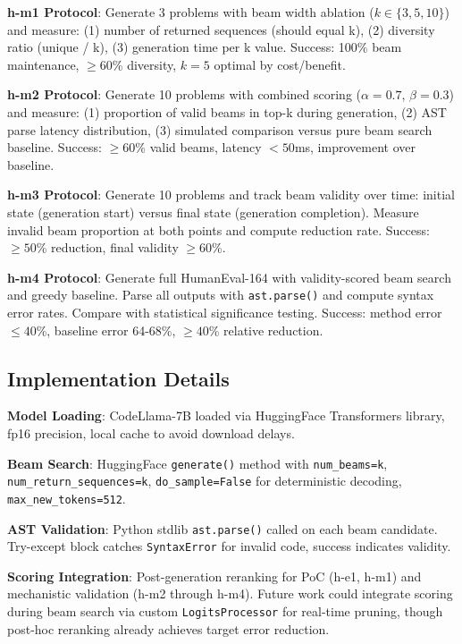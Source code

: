 \textbf{h-m1 Protocol}: Generate 3 problems with beam width ablation ($k \in \{3, 5, 10\}$) and measure: (1) number of returned sequences (should equal k), (2) diversity ratio (unique / k), (3) generation time per k value. Success: 100\% beam maintenance, $\geq 60$\% diversity, $k=5$ optimal by cost/benefit.

\textbf{h-m2 Protocol}: Generate 10 problems with combined scoring ($\alpha=0.7$, $\beta=0.3$) and measure: (1) proportion of valid beams in top-k during generation, (2) AST parse latency distribution, (3) simulated comparison versus pure beam search baseline. Success: $\geq 60$\% valid beams, latency $<50$ms, improvement over baseline.

\textbf{h-m3 Protocol}: Generate 10 problems and track beam validity over time: initial state (generation start) versus final state (generation completion). Measure invalid beam proportion at both points and compute reduction rate. Success: $\geq 50$\% reduction, final validity $\geq 60$\%.

\textbf{h-m4 Protocol}: Generate full HumanEval-164 with validity-scored beam search and greedy baseline. Parse all outputs with \texttt{ast.parse()} and compute syntax error rates. Compare with statistical significance testing. Success: method error $\leq 40$\%, baseline error 64-68\%, $\geq 40$\% relative reduction.

\subsection{Implementation Details}

\textbf{Model Loading}: CodeLlama-7B loaded via HuggingFace Transformers library, fp16 precision, local cache to avoid download delays.

\textbf{Beam Search}: HuggingFace \texttt{generate()} method with \texttt{num\_beams=k}, \texttt{num\_return\_sequences=k}, \texttt{do\_sample=False} for deterministic decoding, \texttt{max\_new\_tokens=512}.

\textbf{AST Validation}: Python stdlib \texttt{ast.parse()} called on each beam candidate. Try-except block catches \texttt{SyntaxError} for invalid code, success indicates validity.

\textbf{Scoring Integration}: Post-generation reranking for PoC (h-e1, h-m1) and mechanistic validation (h-m2 through h-m4). Future work could integrate scoring during beam search via custom \texttt{LogitsProcessor} for real-time pruning, though post-hoc reranking already achieves target error reduction.

